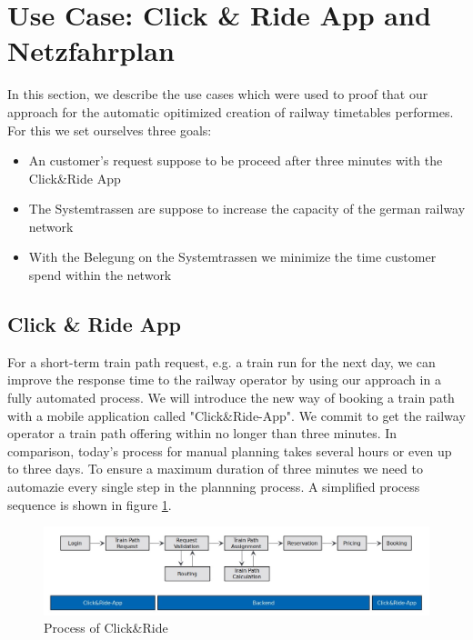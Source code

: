 \section{Use Case: Click \& Ride App and Netzfahrplan}
\label{chap:useCases}
In this section, we describe the use cases which were used to proof that our approach for the automatic opitimized creation of railway timetables performes. For this we set ourselves three goals: 

\begin{itemize}
	\item[1)] An customer's request suppose to be proceed after three minutes with the Click\&Ride App
	\item[2)] The Systemtrassen are suppose to increase the capacity of the german railway network
	\item[3)] With the Belegung on the Systemtrassen we minimize the time customer spend within the network
\end{itemize}

\subsection{Click \& Ride App}
\label{chap:CnR}
For a short-term train path request, e.g. a train run for the next day, we can improve the response time to the railway operator by using our approach in a fully automated process. We will introduce the new way of booking a train path with a mobile application called "Click\&Ride-App". We commit to get the railway operator a train path offering within no longer than three minutes. In comparison, today's process for manual planning takes several hours or even up to three days. To ensure a maximum duration of three minutes we need to automazie every single step in the plannning process. A simplified process sequence is shown in figure \ref{fig:process_sequence}. 
\begin{figure}[htb]
	\centering
	\includegraphics[width=\textwidth]{Bilder/process_sequence.jpg}
	\caption{Process of Click\&Ride}
	\label{fig:process_sequence}
\end{figure}

